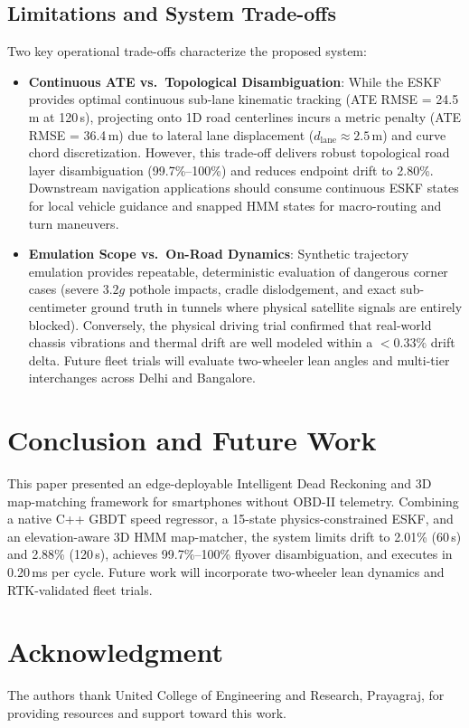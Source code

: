 \documentclass[conference]{IEEEtran}
\begin{document}
\subsection{Limitations and System Trade-offs}
Two key operational trade-offs characterize the proposed system:
\begin{itemize}
\item \textbf{Continuous ATE vs.\ Topological Disambiguation}: While the ESKF provides optimal continuous sub-lane kinematic tracking (ATE RMSE = 24.5\,m at 120\,s), projecting onto 1D road centerlines incurs a metric penalty (ATE RMSE = 36.4\,m) due to lateral lane displacement ($d_{\text{lane}} \approx 2.5$\,m) and curve chord discretization. However, this trade-off delivers robust topological road layer disambiguation (99.7\%--100\%) and reduces endpoint drift to 2.80\%. Downstream navigation applications should consume continuous ESKF states for local vehicle guidance and snapped HMM states for macro-routing and turn maneuvers.
\item \textbf{Emulation Scope vs.\ On-Road Dynamics}: Synthetic trajectory emulation provides repeatable, deterministic evaluation of dangerous corner cases (severe $3.2g$ pothole impacts, cradle dislodgement, and exact sub-centimeter ground truth in tunnels where physical satellite signals are entirely blocked). Conversely, the physical driving trial confirmed that real-world chassis vibrations and thermal drift are well modeled within a $<0.33\%$ drift delta. Future fleet trials will evaluate two-wheeler lean angles and multi-tier interchanges across Delhi and Bangalore.
\end{itemize}

\section{Conclusion and Future Work}
This paper presented an edge-deployable Intelligent Dead Reckoning and 3D map-matching framework for smartphones without OBD-II telemetry. Combining a native C++ GBDT speed regressor, a 15-state physics-constrained ESKF, and an elevation-aware 3D HMM map-matcher, the system limits drift to 2.01\% (60\,s) and 2.88\% (120\,s), achieves 99.7\%--100\% flyover disambiguation, and executes in 0.20\,ms per cycle. Future work will incorporate two-wheeler lean dynamics and RTK-validated fleet trials.

\section*{Acknowledgment}
The authors thank United College of Engineering and Research, Prayagraj, for providing resources and support toward this work.
\end{document}
